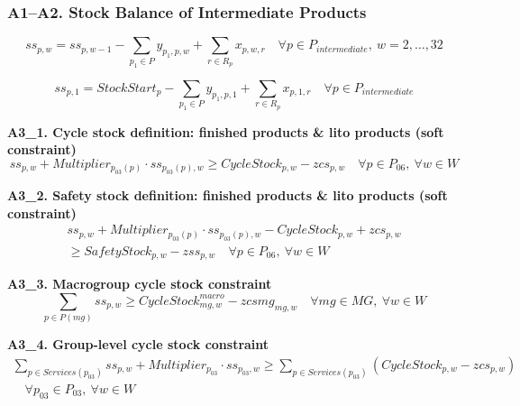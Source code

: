 \documentclass{article}
\begin{document}
\text{---------------------------------------------------------------------------------------------------------}

\subsubsection*{A1--A2. Stock Balance of Intermediate Products}

\begin{equation}
ss_{p,w} = ss_{p,w-1} - \sum_{p_1 \in P} y_{p_1,p,w} + \sum_{r \in R_p} x_{p,w,r} 
\quad \forall p \in P_{intermediate},\ w = 2,\ldots,32
\label{eq:A1}
\end{equation}

\begin{equation}
ss_{p,1} = StockStart_p - \sum_{p_1 \in P} y_{p_1,p,1} + \sum_{r \in R_p} x_{p,1,r}
\quad \forall p \in P_{intermediate}
\label{eq:A2}
\end{equation}


\noindent\textbf{A3\_1. Cycle stock definition: finished products \& lito products (soft constraint)}
\begin{equation}
ss_{p,w} + Multiplier_{p_{03}(p)} \cdot ss_{p_{03}(p),w}
\geq CycleStock_{p,w} - zcs_{p,w}
\quad \forall p \in P_{06},\ \forall w \in W
\label{eq:A3_1}
\end{equation}



\noindent\textbf{A3\_2. Safety stock definition: finished products \& lito products (soft constraint)}
\begin{equation}
\begin{gathered}
ss_{p,w} + Multiplier_{p_{03}(p)} \cdot ss_{p_{03}(p),w} 
- CycleStock_{p,w} + zcs_{p,w} \\
\geq SafetyStock_{p,w} - zss_{p,w}
\quad \forall p \in P_{06},\ \forall w \in W
\end{gathered}
\label{eq:A3_2}
\end{equation}



\noindent\textbf{A3\_3. Macrogroup cycle stock constraint}
\begin{equation}
\sum_{p \in P(mg)} ss_{p,w} \geq CycleStock^{macro}_{mg,w} 
- zcsmg_{mg,w}
\quad \forall mg \in MG,\ \forall w \in W
\label{eq:A3_5}
\end{equation}



\noindent\textbf{A3\_4. Group-level cycle stock constraint}
\begin{equation}
\begin{gathered}
\sum_{p \in Services(p_{03})} ss_{p,w} + 
Multiplier_{p_{03}} \cdot ss_{p_{03},w}
\geq \sum_{p \in Services(p_{03})} 
\left( CycleStock_{p,w} - zcs_{p,w} \right) \\
\quad \forall p_{03} \in P_{03},\ \forall w \in W
\end{gathered}
\label{eq:A3_3}
\end{equation}
\end{document}
